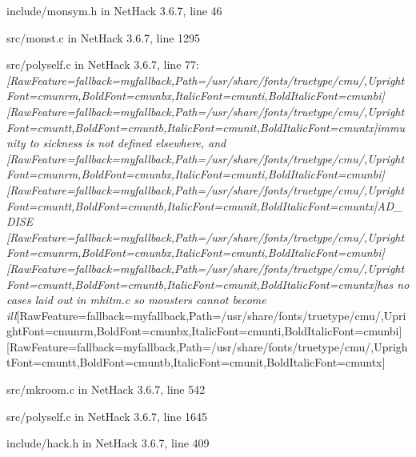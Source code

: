 \begin{myenumerate}
\item{} include/monsym.h in NetHack 3.6.7, line 46\footnotemark[154]

\item{} src/monst.c in NetHack 3.6.7, line 1295\footnotemark[155]

\item{} src/polyself.c in NetHack 3.6.7, line 77\footnotemark[156]: {\itshape \allowbreak{}\setmainfont{cmunti.ttf}[RawFeature={fallback=myfallback},Path=/usr/share/fonts/truetype/cmu/,UprightFont=cmunrm,BoldFont=cmunbx,ItalicFont=cmunti,BoldItalicFont=cmunbi]\setmonofont{cmunti.ttf}[RawFeature={fallback=myfallback},Path=/usr/share/fonts/truetype/cmu/,UprightFont=cmuntt,BoldFont=cmuntb,ItalicFont=cmunit,BoldItalicFont=cmuntx]\itshape immunity to sickness is not defined elsewhere, and {\ttfamily \allowbreak{}\setmainfont{cmunit.ttf}[RawFeature={fallback=myfallback},Path=/usr/share/fonts/truetype/cmu/,UprightFont=cmunrm,BoldFont=cmunbx,ItalicFont=cmunti,BoldItalicFont=cmunbi]\setmonofont{cmunit.ttf}[RawFeature={fallback=myfallback},Path=/usr/share/fonts/truetype/cmu/,UprightFont=cmuntt,BoldFont=cmuntb,ItalicFont=cmunit,BoldItalicFont=cmuntx]\ttfamily \itshape AD\_DISE}{$\text{ }$}\allowbreak{}\setmainfont{cmunti.ttf}[RawFeature={fallback=myfallback},Path=/usr/share/fonts/truetype/cmu/,UprightFont=cmunrm,BoldFont=cmunbx,ItalicFont=cmunti,BoldItalicFont=cmunbi]\setmonofont{cmunti.ttf}[RawFeature={fallback=myfallback},Path=/usr/share/fonts/truetype/cmu/,UprightFont=cmuntt,BoldFont=cmuntb,ItalicFont=cmunit,BoldItalicFont=cmuntx]\itshape  has no cases laid out in mhitm.c so monsters cannot become ill}\allowbreak{}\setmainfont{cmunrm.ttf}[RawFeature={fallback=myfallback},Path=/usr/share/fonts/truetype/cmu/,UprightFont=cmunrm,BoldFont=cmunbx,ItalicFont=cmunti,BoldItalicFont=cmunbi]\setmonofont{cmunrm.ttf}[RawFeature={fallback=myfallback},Path=/usr/share/fonts/truetype/cmu/,UprightFont=cmuntt,BoldFont=cmuntb,ItalicFont=cmunit,BoldItalicFont=cmuntx]

\item{} src/mkroom.c in NetHack 3.6.7, line 542\footnotemark[157]

\item{} src/polyself.c in NetHack 3.6.7, line 1645\footnotemark[158]
     
\item{} include/hack.h in NetHack 3.6.7, line 409\footnotemark[159]
\end{myenumerate}
